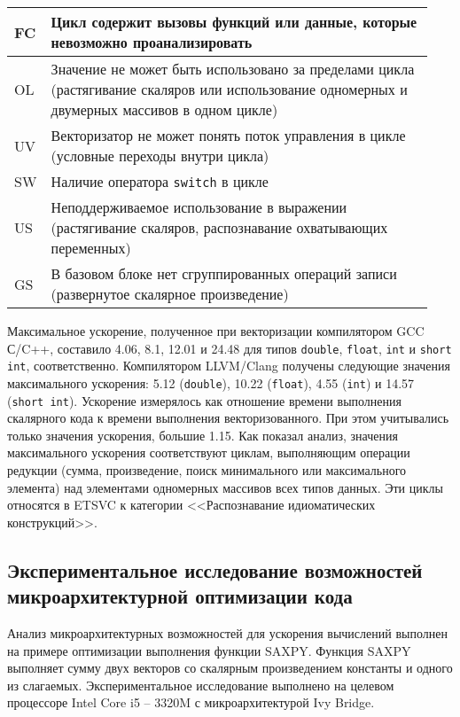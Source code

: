 \begin{table}[h!]
\begin{tabular}{|C{0.04\linewidth}|L{0.9\linewidth}|}
\hline
{}FC & Цикл содержит вызовы функций или данные, которые невозможно проанализировать\\  
\hline
{}OL & Значение не может быть использовано за пределами цикла (растягивание скаляров или использование одномерных и двумерных массивов в одном цикле)\\
\hline
{}UV & Векторизатор не может понять поток управления в цикле (условные переходы внутри цикла)\\
\hline
{}SW & Наличие оператора \texttt{switсh} в цикле\\
\hline
{}US & Неподдерживаемое использование в выражении (растягивание скаляров, распознавание охватывающих переменных)\\
\hline
{}GS & В базовом блоке нет сгруппированных операций записи (развернутое скалярное произведение)\\  
\hline
\end{tabular}
\end{table} 

Максимальное ускорение, полученное при векторизации компилятором GCC С/C++, составило 4.06, 8.1, 12.01 и 24.48 для типов \texttt{double}, \texttt{float}, \texttt{int} и \texttt{short int}, соответственно. Компилятором LLVM/Clang получены следующие значения максимального ускорения: 5.12 (\texttt{double}), 10.22 (\texttt{float}), 4.55 (\texttt{int}) и 14.57 (\texttt{short int}). Ускорение измерялось как отношение времени выполнения скалярного кода к времени выполнения векторизованного. При этом учитывались только значения ускорения, большие 1.15. Как показал анализ, значения максимального ускорения соответствуют циклам, выполняющим операции редукции (сумма, произведение, поиск минимального или максимального элемента) над элементами одномерных массивов всех типов данных. Эти циклы относятся в ETSVC к категории <<Распознавание идиоматических конструкций>>.

\subsection{Экспериментальное исследование возможностей микроархитектурной оптимизации кода}
Анализ микроархитектурных возможностей для ускорения вычислений выполнен на примере оптимизации выполнения функции SAXPY. Функция SAXPY выполняет сумму двух векторов со скалярным произведением константы и одного из слагаемых. Экспериментальное исследование выполнено на целевом процессоре Intel Core i5 -- 3320M с микроархитектурой Ivy Bridge.

